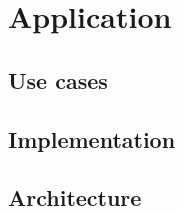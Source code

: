 
\chapter{Application}
\label{chapter:application}


\section{Use cases}
\label{section:useCases}

\section{Implementation}
\label{section:implementation}

\section{Architecture}
\label{section:architecture}


